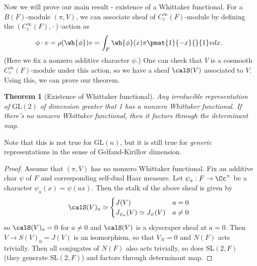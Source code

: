 \documentclass{article}
\newtheorem{theorem}{Theorem}[section]
\newcommand{\GL}{\mathrm{GL}}
\newcommand{\SL}{\mathrm{SL}}
\begin{document}
Now we will prove our main result - existence of a Whittaker functional. 
For a $B(F)$-module $(\pi, V)$, we can associate sheaf of $C^{\infty}_{c}(F)$-module by defining the $(C_{c}^{\infty}(F), \cdot)$-action as
$$
\phi \cdot v = \rho(\wh{\phi})v = \int_F \wh{\phi}(x) \pi \pmat{1}{-x}{}{1} v dx. 
$$
(Here we fix a nonzero additive character $\psi$.) One can check that $V$ is a cosmooth $C_{c}^{\infty}(F)$-module under this action, so we have a sheaf $\calS(V)$ associated to $V$. Using this, we can prove our theorem. 
\begin{theorem}[Existence of Whittaker functional]
\label{dim1}
Any irreducible representation of $\GL(2)$ of dimension greater that 1 has a nonzero Whittaker functional. If there's no nonzero Whittaker functional, then it factors through the determinant map. 
\end{theorem}
Note that this is not true for $\GL(n)$, but it is still true for \emph{generic} representations in the sense of Gelfand-Kirillov dimension. 


\begin{proof}
Assume that $(\pi, V)$ has no nonzero Whittaker functional. Fix an additive char $\psi$ of $F$ and corresponding self-dual Haar measure. Let $\psi_a:F\to \Cc^{\times}$ be a character $\psi_a(x)=\psi(ax)$. Then the stalk of the above sheaf is given by
 $$
\calS(V)_{a} \simeq \begin{cases} J(V) & a = 0 \\ J_{\psi_{a}}(V) \simeq J_{\psi}(V) & a\neq 0 \end{cases}
$$
so $\calS(V)_a = 0$ for $a\neq 0$ and $\calS(V)$  is a skyscraper sheaf at $a=0$. Then $V\to S(V)_0=J(V)$ is an isomorphism, so that $V_N=0$ and $N(F)$ acts trivially. Then all conjugates of $N(F)$ also acts trivially, so does $\SL(2, F)$ (they generate $\SL(2,F)$) and factors through determinant map. 
\end{proof}
\end{document}
